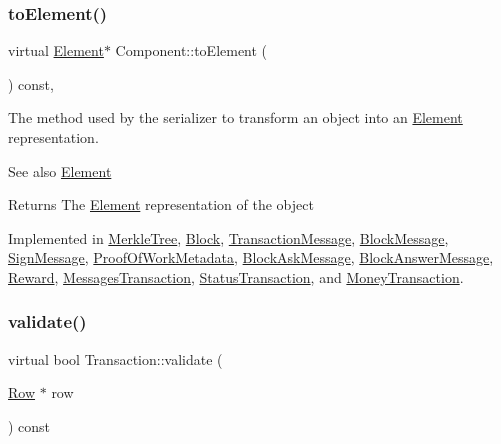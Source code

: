 \subsubsection{\texorpdfstring{to\+Element()}{toElement()}}
{\footnotesize\ttfamily virtual \mbox{\hyperlink{classElement}{Element}}$\ast$ Component\+::to\+Element (\begin{DoxyParamCaption}{ }\end{DoxyParamCaption}) const\hspace{0.3cm}{\ttfamily [pure virtual]}, {\ttfamily [inherited]}}

The method used by the serializer to transform an object into an \mbox{\hyperlink{classElement}{Element}} representation. \begin{DoxySeeAlso}{See also}
\mbox{\hyperlink{classElement}{Element}}
\end{DoxySeeAlso}
\begin{DoxyReturn}{Returns}
The \mbox{\hyperlink{classElement}{Element}} representation of the object 
\end{DoxyReturn}


Implemented in \mbox{\hyperlink{classMerkleTree_a4e72819c6cbc49ed8ce092f464711a5f}{Merkle\+Tree}}, \mbox{\hyperlink{classBlock_aa289363a40f0d3ba88720ad0bc71f34f}{Block}}, \mbox{\hyperlink{classTransactionMessage_ae20e7d6a7b5811bb56a32ec6af59b8e2}{Transaction\+Message}}, \mbox{\hyperlink{classBlockMessage_ab47afd5cfb7d6d5c544d8def5d0f9737}{Block\+Message}}, \mbox{\hyperlink{classSignMessage_aee897c4bf78df966b8cca95e589566e4}{Sign\+Message}}, \mbox{\hyperlink{classProofOfWorkMetadata_a2aab4c26afb3a85a712cc065028274d9}{Proof\+Of\+Work\+Metadata}}, \mbox{\hyperlink{classBlockAskMessage_a0bc20076f19423855ab5772003fb65f6}{Block\+Ask\+Message}}, \mbox{\hyperlink{classBlockAnswerMessage_ac7f35ec9f7f2fbcd726628c2a984518b}{Block\+Answer\+Message}}, \mbox{\hyperlink{classReward_a0ecd536148463880f9980fe415b6eb1d}{Reward}}, \mbox{\hyperlink{classMessagesTransaction_a0ef8ec080a2698a02ad8b1b95d243720}{Messages\+Transaction}}, \mbox{\hyperlink{classStatusTransaction_aed42f2d61f2d50ec07bb6b35473f61f2}{Status\+Transaction}}, and \mbox{\hyperlink{classMoneyTransaction_a84adc847266467965014cb04acd48bea}{Money\+Transaction}}.

\mbox{\label{classTransaction_a638518143f0defde1c3c73e33db1b7f1}} 
\subsubsection{\texorpdfstring{validate()}{validate()}}
{\footnotesize\ttfamily virtual bool Transaction\+::validate (\begin{DoxyParamCaption}\item[{\mbox{\hyperlink{classRow}{Row}} $\ast$}]{row }\end{DoxyParamCaption}) const\hspace{0.3cm}{\ttfamily [pure virtual]}}

